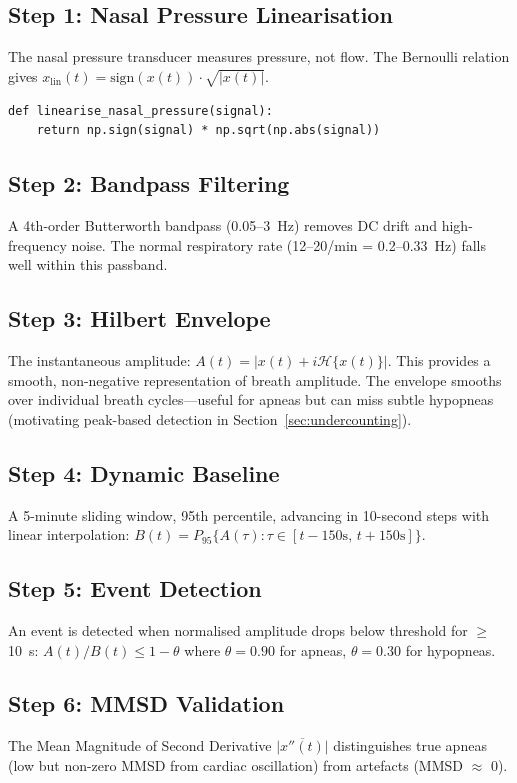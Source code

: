 \documentclass[11pt,a4paper]{article}
\begin{document}
\subsection{Step 1: Nasal Pressure Linearisation}
The nasal pressure transducer measures pressure, not flow. The
Bernoulli relation gives
$x_{\text{lin}}(t) = \text{sign}(x(t)) \cdot \sqrt{|x(t)|}$.

\begin{lstlisting}
def linearise_nasal_pressure(signal):
    return np.sign(signal) * np.sqrt(np.abs(signal))
\end{lstlisting}

\subsection{Step 2: Bandpass Filtering}
A 4th-order Butterworth bandpass (0.05--3~Hz) removes DC drift and
high-frequency noise. The normal respiratory rate (12--20/min =
0.2--0.33~Hz) falls well within this passband.

\subsection{Step 3: Hilbert Envelope}
The instantaneous amplitude: $A(t) = |x(t) + i\mathcal{H}\{x(t)\}|$.
This provides a smooth, non-negative representation of breath amplitude.
The envelope smooths over individual breath cycles---useful for apneas
but can miss subtle hypopneas (motivating peak-based detection in
Section~\ref{sec:undercounting}).

\subsection{Step 4: Dynamic Baseline}
A 5-minute sliding window, 95th percentile, advancing in 10-second
steps with linear interpolation:
$B(t) = P_{95}\{A(\tau) : \tau \in [t-150\text{s},\, t+150\text{s}]\}$.

\subsection{Step 5: Event Detection}
An event is detected when normalised amplitude drops below threshold
for $\geq$10~s:
$A(t)/B(t) \leq 1 - \theta$ where $\theta = 0.90$ for apneas,
$\theta = 0.30$ for hypopneas.

\subsection{Step 6: MMSD Validation}
The Mean Magnitude of Second Derivative
$\overline{|x''(t)|}$ distinguishes true apneas (low but non-zero
MMSD from cardiac oscillation) from artefacts (MMSD $\approx$ 0).
\end{document}
